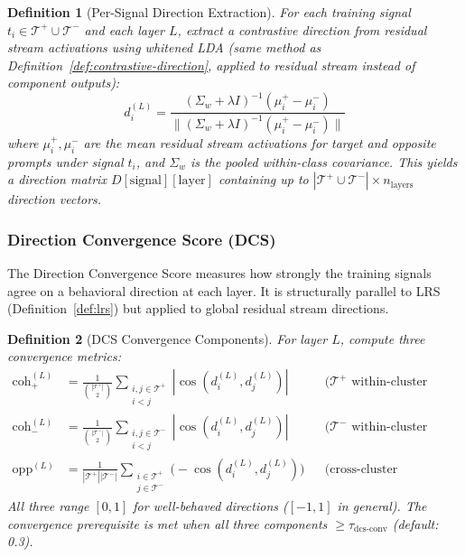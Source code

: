 \documentclass[11pt]{article}
\newtheorem{definition}{Definition}[section]
\begin{document}
\begin{definition}[Per-Signal Direction Extraction]
\label{def:per-signal-direction}
For each training signal $t_i \in \mathcal{T}^+ \cup \mathcal{T}^-$ and each layer $L$, extract a contrastive direction from residual stream activations using whitened LDA (same method as Definition~\ref{def:contrastive-direction}, applied to residual stream instead of component outputs):
\begin{equation}
d^{(L)}_i = \frac{(\Sigma_w + \lambda I)^{-1}(\mu^+_i - \mu^-_i)}{\|(\Sigma_w + \lambda I)^{-1}(\mu^+_i - \mu^-_i)\|}
\end{equation}
where $\mu^+_i, \mu^-_i$ are the mean residual stream activations for target and opposite prompts under signal $t_i$, and $\Sigma_w$ is the pooled within-class covariance. This yields a direction matrix $D[\text{signal}][\text{layer}]$ containing up to $|\mathcal{T}^+ \cup \mathcal{T}^-| \times n_{\text{layers}}$ direction vectors.
\end{definition}

\subsubsection{Direction Convergence Score (DCS)}
\label{sec:dcs}

The Direction Convergence Score measures how strongly the training signals agree on a behavioral direction at each layer. It is structurally parallel to LRS (Definition~\ref{def:lrs}) but applied to global residual stream directions.

\begin{definition}[DCS Convergence Components]
\label{def:dcs-convergence}
For layer $L$, compute three convergence metrics:
\begin{align}
\text{coh}_+^{(L)} &= \frac{1}{\binom{|\mathcal{T}^+|}{2}} \sum_{\substack{i,j \in \mathcal{T}^+ \\ i < j}} |\cos(d^{(L)}_i, d^{(L)}_j)| & &\text{($\mathcal{T}^+$ within-cluster coherence)} \\[0.5em]
\text{coh}_-^{(L)} &= \frac{1}{\binom{|\mathcal{T}^-|}{2}} \sum_{\substack{i,j \in \mathcal{T}^- \\ i < j}} |\cos(d^{(L)}_i, d^{(L)}_j)| & &\text{($\mathcal{T}^-$ within-cluster coherence)} \\[0.5em]
\text{opp}^{(L)} &= \frac{1}{|\mathcal{T}^+||\mathcal{T}^-|} \sum_{\substack{i \in \mathcal{T}^+ \\ j \in \mathcal{T}^-}} \bigl(-\cos(d^{(L)}_i, d^{(L)}_j)\bigr) & &\text{(cross-cluster opposition)}
\end{align}
All three range $[0,1]$ for well-behaved directions ($[-1,1]$ in general). The convergence prerequisite is met when all three components $\geq \tau_{\text{dcs-conv}}$ (default: 0.3).
\end{definition}
\end{document}
